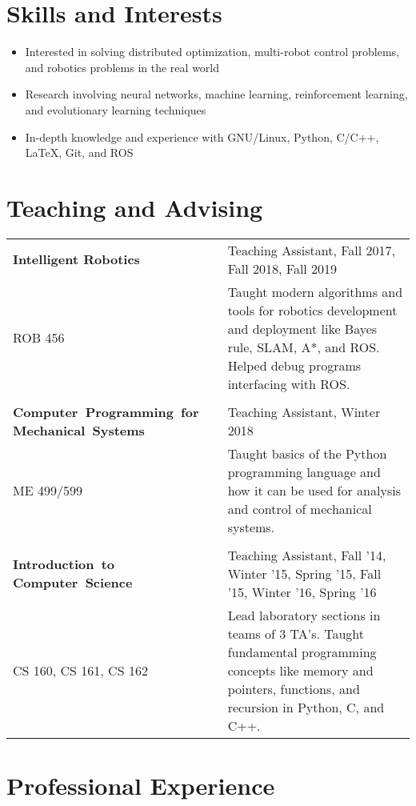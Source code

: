 \documentclass[letterpaper,10pt,titlepage]{article}
\newcommand{\leftW}{0.32\textwidth}
\begin{document}
\section*{Skills and Interests}
\begin{itemize} \itemsep1pt \parskip0pt 
\item Interested in solving distributed optimization, multi-robot control problems, and robotics problems in the real world
\item Research involving neural networks, machine learning, reinforcement learning, and evolutionary learning techniques
\item In-depth knowledge and experience with GNU/Linux, Python, C/C++, \LaTeX, Git, and ROS
\end{itemize}


\section*{Teaching and Advising}
\begin{tabularx}{\linewidth}{p{\leftW}X}
	\textbf{Intelligent Robotics}&Teaching Assistant, Fall 2017, Fall 2018, Fall 2019\\
	ROB 456 & Taught modern algorithms and tools for robotics development and deployment like Bayes rule, SLAM, A*, and ROS. Helped debug programs interfacing with ROS. \\
	\\
	\textbf{\mbox{Computer Programming for} \mbox{Mechanical Systems}} & Teaching Assistant, Winter 2018\\
	ME 499/599 & Taught basics of the Python programming language and how it can be used for analysis and control of mechanical systems. \\
	\\
	\textbf{\mbox{Introduction to} \mbox{Computer Science}} & Teaching Assistant, Fall '14, Winter '15, Spring '15, Fall '15, Winter '16, Spring '16\\
	CS 160, CS 161, CS 162 &  Lead laboratory sections in teams of 3 TA's. Taught fundamental programming concepts like memory and pointers, functions, and recursion in Python, C, and C++.
\end{tabularx}


\section*{Professional Experience}
\end{document}
